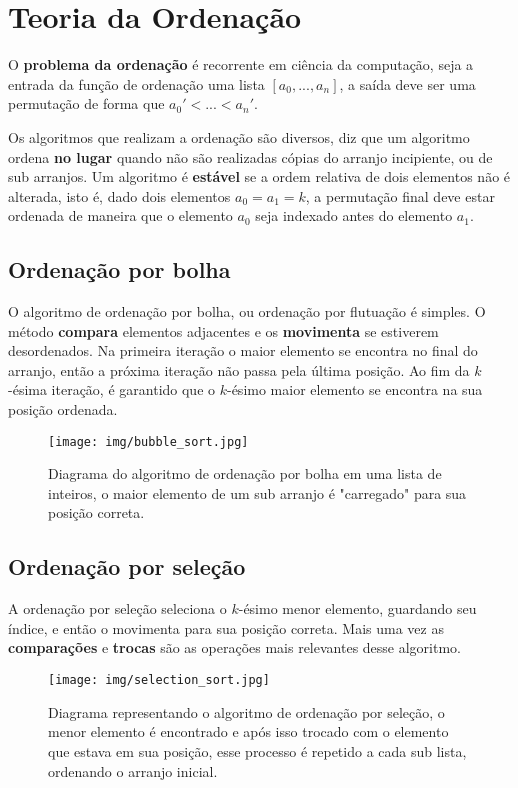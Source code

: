 \section{Teoria da Ordenação}

O \textbf{problema da ordenação} é recorrente em ciência da computação, seja a entrada da função de ordenação uma lista $[a_0,...,a_n]$, a saída deve ser uma permutação de forma que $a_0'<...<a_n'$.

Os algoritmos que realizam a ordenação são diversos, diz que um algoritmo ordena \textbf{no lugar} quando não são realizadas cópias do arranjo incipiente, ou de sub arranjos. Um algoritmo é \textbf{estável} se a ordem relativa de dois elementos não é alterada, isto é, dado dois elementos $a_0=a_1=k$, a permutação final deve estar ordenada de maneira que o elemento $a_0$ seja indexado antes do elemento $a_1$.

\subsection{Ordenação por bolha}

O algoritmo de ordenação por bolha, ou ordenação por flutuação é simples. O método \textbf{compara} elementos adjacentes e os \textbf{movimenta} se estiverem desordenados. Na primeira iteração o maior elemento se encontra no final do arranjo, então a próxima iteração não passa pela última posição. Ao fim da $k$-ésima iteração, é garantido que o $k$-ésimo maior elemento se encontra na sua posição ordenada.

\begin{figure}[H]
  \centering
  \texttt{[image: img/bubble\_sort.jpg]}
    \caption{Diagrama do algoritmo de ordenação por bolha em uma lista de inteiros, o maior elemento de um sub arranjo é "carregado" para sua posição correta.}
    \label{bubble_sort}
\end{figure}

\subsection{Ordenação por seleção}

A ordenação por seleção seleciona o $k$-ésimo menor elemento, guardando seu índice, e então o movimenta para sua posição correta. Mais uma vez as \textbf{comparações} e \textbf{trocas} são as operações mais relevantes desse algoritmo.

\begin{figure}[H]
  \centering
  \texttt{[image: img/selection\_sort.jpg]}
    \caption{Diagrama representando o algoritmo de ordenação por seleção, o menor elemento é encontrado e após isso trocado com o elemento que estava em sua posição, esse processo é repetido a cada sub lista, ordenando o arranjo inicial.}
    \label{insertion_sort}
\end{figure}

